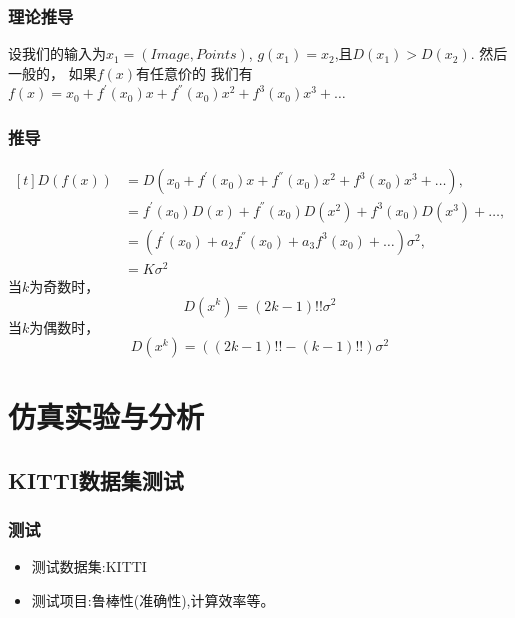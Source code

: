 \documentclass{beamer}
\begin{document}
\begin{frame}
  \frametitle{理论推导}
  设我们的输入为$x_1=(Image,Points)$,
  $g(x_1)=x_2$,且$D(x_1)>D(x_2)$.
  然后一般的，
  如果$f(x)$有任意价的
  我们有$f(x)=x_0+f^{'}(x_0)x+f^{''}(x_0)x^2+f^{3}(x_0)x^3+\dots$

\end{frame}
\begin{frame}
  \frametitle{推导}
    \begin{equation}
    \label{eq:05}
    \begin{aligned}[t]
      D(f(x)) & =D(x_0+f^{'}(x_0)x+f^{''}(x_0)x^2+f^{3}(x_0)x^3+\dots),\\
      &= f^{'}(x_0)D(x)+f^{''}(x_0)D(x^2)+f^3(x_0)D(x^3)+\dots,\\
      &=(f^{'}(x_0)+a_2f^{''}(x_0)+a_3f^3(x_0)+\dots)\sigma^2,\\
      &=K\sigma^2
    \end{aligned}
  \end{equation}
  当$k$为奇数时，
  \begin{equation}
    \label{eq:06}
    D(x^k)=(2k-1)!! \sigma^2
  \end{equation}
  当$k$为偶数时，
    \begin{equation}
    \label{eq:07}
    D(x^k)=((2k-1)!!-(k-1)!!) \sigma^2
  \end{equation}
\end{frame}
\section{仿真实验与分析}
\subsection{KITTI数据集测试}
\begin{frame}
  \frametitle{测试}
  
\begin{itemize}
\item 测试数据集:KITTI
\item 测试项目:鲁棒性(准确性),计算效率等。
\end{itemize}  
\end{frame}


  
\end{document}
